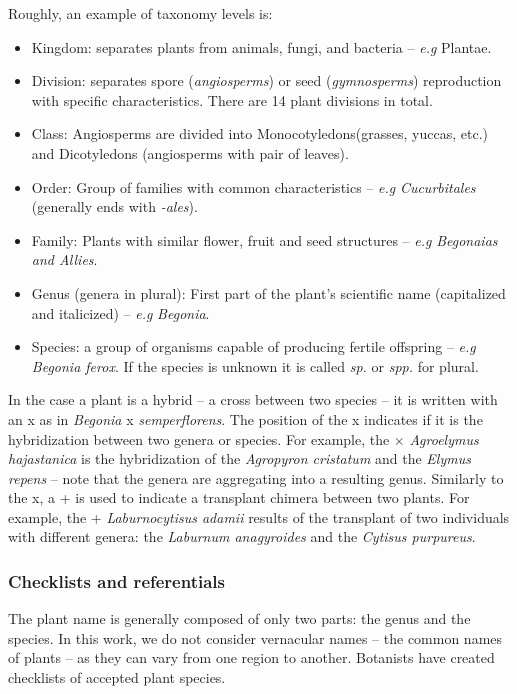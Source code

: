 Roughly, an example of taxonomy levels is:
\begin{itemize}
        \item Kingdom: separates plants from animals, fungi, and bacteria -- \emph{e.g} Plantae.
        \item Division: separates spore (\emph{angiosperms}) or seed (\emph{gymnosperms}) reproduction with specific characteristics. There are 14 plant divisions in total.
        \item Class: Angiosperms are divided into Monocotyledons(grasses, yuccas, etc.) and Dicotyledons (angiosperms with pair of leaves).
        \item Order: Group of families with common characteristics -- \emph{e.g} \emph{Cucurbitales} (generally ends with \emph{-ales}).
        \item Family: Plants with similar flower, fruit and seed structures -- \emph{e.g} \emph{Begonaias and Allies}.
        \item Genus (genera in plural): First part of the plant's scientific name (capitalized and italicized) -- \emph{e.g} \emph{Begonia}.
        \item Species: a group of organisms capable of producing fertile offspring -- \emph{e.g} \emph{Begonia ferox}. If the species is unknown it is called \emph{sp.} or \emph{spp.} for plural.
\end{itemize}

In the case a plant is a hybrid -- a cross between two species -- it is written with an x as in \emph{Begonia} x \emph{semperflorens}. The position of the x indicates if it is the hybridization between two genera or species.
For example, the × \emph{Agroelymus hajastanica} is the hybridization of the \emph{Agropyron cristatum} and the \emph{Elymus repens} -- note that the genera are aggregating into a resulting genus.
Similarly to the x, a + is used to indicate a transplant chimera between two plants.
For example, the + \emph{Laburnocytisus adamii} results of the transplant of two individuals with different genera: the \emph{Laburnum anagyroides} and the \emph{Cytisus purpureus}.


\subsubsection{Checklists and referentials}

The plant name is generally composed of only two parts: the genus and the species.
In this work, we do not consider vernacular names -- the common names of plants -- as they can vary from one region to another.
Botanists have created checklists of accepted plant species.

